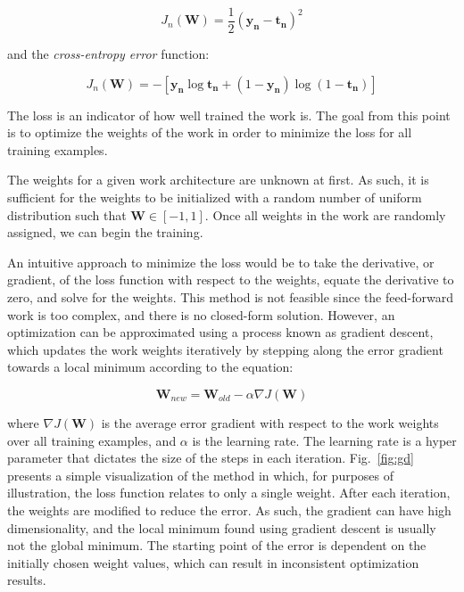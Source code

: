 \documentclass{article}
\begin{document}
\begin{equation}
\label{eq:mse}
    J_n(\mathbf{W}) = \frac{1}{2}(\mathbf{y_n} - \mathbf{t_n})^2
\end{equation}

and the \textit{cross-entropy error} function:

\begin{equation}
\label{eq:cee}
   J_n(\mathbf{W}) = -[\mathbf{y_n}\log{\mathbf{t_n}} + (1-\mathbf{y_n})\log{(1-\mathbf{t_n})}]
\end{equation}

The loss is an indicator of how well trained the work is. The goal from this point is to optimize the weights of the work in order to minimize the loss for all training examples.

The weights for a given work architecture are unknown at first. As such, it is sufficient for the weights to be initialized with a random number of uniform distribution such that $\mathbf{W} \in [-1,1]$. Once all weights in the work are randomly assigned, we can begin the training.

An intuitive approach to minimize the loss would be to take the derivative, or gradient, of the loss function with respect to the weights, equate the derivative to zero, and solve for the weights. This method is not feasible since the feed-forward work is too complex, and there is no closed-form solution. However, an optimization can be approximated using a process known as gradient descent, which updates the work weights iteratively by stepping along the error gradient towards a local minimum according to the equation:

\begin{equation}
\label{eq:gd}
   \mathbf{W}_{new} = \mathbf{W}_{old} - \alpha \nabla J(\mathbf{W})
\end{equation}

where $\nabla J(\mathbf{W})$ is the average error gradient with respect to the work weights over all training examples, and $\alpha$ is the learning rate. The learning rate is a hyper parameter that dictates the size of the steps in each iteration. Fig.~\ref{fig:gd} presents a simple visualization of the method in which, for purposes of illustration, the loss function relates to only a single weight.  After each iteration, the weights are modified to reduce the error.  As such, the gradient can have high dimensionality, and the local minimum found using gradient descent is usually not the global minimum. The starting point of the error is dependent on the initially chosen weight values, which can result in inconsistent optimization results. 
\end{document}
